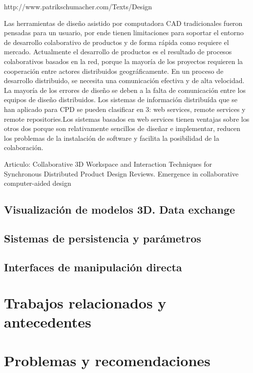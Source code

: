 http://www.patrikschumacher.com/Texts/Design%

Las herramientas de diseño asistido por computadora CAD tradicionales fueron pensadas para un usuario, por ende tienen limitaciones para soportar el entorno de desarrollo colaborativo de productos y de forma rápida como requiere el mercado. Actualmente el desarrollo de productos es el resultado de procesos colaborativos basados en la red, porque la mayoría de los proyectos requieren la cooperación entre actores distribuidos geográficamente. En un proceso de desarrollo distribuido, se necesita una comunicación efectiva y de alta velocidad. La mayoría de los errores de diseño se deben a la falta de comunicación entre los equipos de diseño distribuidos.
Los sistemas de información distribuída que se han aplicado para CPD se pueden clasificar en 3: web services, remote services y remote repositories.Los sistemas basados en web services tienen ventajas sobre los otros dos porque son relativamente sencillos de diseñar e implementar, reducen los problemas de la instalación de software y facilita la posibilidad de la colaboración. \cite{Nyamsuren2015}



Articulo: Collaborative 3D Workspace and Interaction Techniques
for Synchronous Distributed Product Design Reviews. 
Emergence in collaborative computer-aided design


\subsection{Visualización de modelos 3D. Data exchange
}

\subsection{Sistemas de persistencia y parámetros
}

\subsection{Interfaces de manipulación directa}

\section{Trabajos relacionados y antecedentes}

\section{Problemas y recomendaciones
}